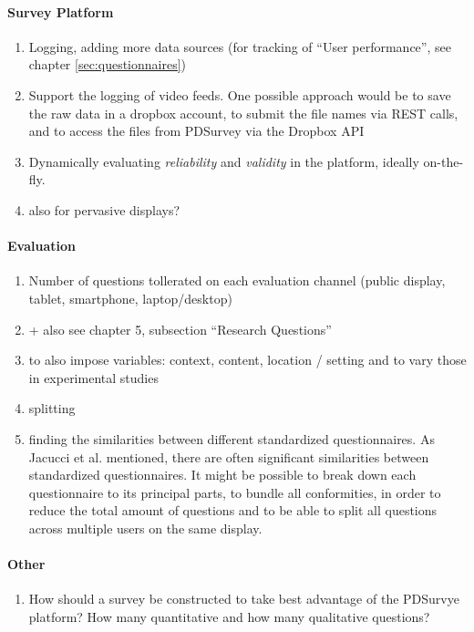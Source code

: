 \paragraph{Survey Platform}

	\begin{enumerate}
	\item Logging, adding more data sources (for tracking of ``User performance'', see chapter \ref{sec:questionnaires})
	\item Support the logging of video feeds. One possible approach would be to save the raw data in a dropbox account, to submit the file names via REST calls, and to access the files from PDSurvey via the Dropbox API
	\item Dynamically evaluating \textit{reliability} and \textit{validity} in the platform, ideally on-the-fly.
	\item also for pervasive displays?
	\end{enumerate}


\paragraph{Evaluation}

	\begin{enumerate}
	\item Number of questions tollerated on each evaluation channel (public display, tablet, smartphone, laptop/desktop)
	\item + also see chapter 5, subsection ``Research Questions'' 
	\item to also impose variables: context, content, location / setting and to vary those in experimental studies
	\item splitting 
	\item finding the similarities between different standardized questionnaires. As Jacucci et al. \cite{jacucci2010worldsofinformation} mentioned, there are often significant similarities between standardized questionnaires. It might be possible to break down each questionnaire to its principal parts, to bundle all conformities, in order to reduce the total amount of questions and to be able to split all questions across multiple users on the same display.
	\end{enumerate}


\paragraph{Other}
	\begin{enumerate}
	\item How should a survey be constructed to take best advantage of the PDSurvye platform? How many quantitative and how many qualitative questions?
	\end{enumerate}


